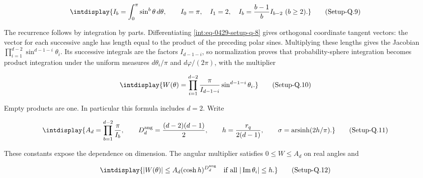 \label{int:eq-setup-q-9}
\begingroup\renewcommand{\theHequation}{intdisplay.877}
\begin{equation}
\intdisplay{
I_b=\int_0^\pi\sin^b\theta\,d\theta,\qquad
I_0=\pi,\quad I_1=2,\quad
I_b=\frac{b-1}{b}I_{b-2}\ (b\ge2).
}
\tag{Setup-Q.9}
\label{int:eq-0430-setup-q-9}
\end{equation}
\endgroup


The recurrence follows by integration by parts. Differentiating \hyperref[int:eq-setup-q-8]{\eqref{int:eq-0429-setup-q-8}} gives orthogonal coordinate tangent vectors: the vector for each successive angle has length equal to the product of the preceding polar sines. Multiplying these lengths gives the Jacobian \(\prod_{i=1}^{d-2}\sin^{d-1-i}\theta_i\). Its successive integrals are the factors \(I_{d-1-i}\), so normalization proves that probability-sphere integration becomes product integration under the uniform measures \(d\theta_i/\pi\) and \(d\varphi/(2\pi)\), with the multiplier


\label{int:eq-setup-q-10}
\begingroup\renewcommand{\theHequation}{intdisplay.878}
\begin{equation}
\intdisplay{
W(\theta)=\prod_{i=1}^{d-2}
\frac{\pi}{I_{d-1-i}}\sin^{d-1-i}\theta_i.
}
\tag{Setup-Q.10}
\label{int:eq-0431-setup-q-10}
\end{equation}
\endgroup


Empty products are one. In particular this formula includes \(d=2\). Write


\label{int:eq-setup-q-11}
\begingroup\renewcommand{\theHequation}{intdisplay.879}
\begin{equation}
\intdisplay{
A_d=\prod_{b=1}^{d-2}\frac{\pi}{I_b},\qquad
D_d^{\rm ang}=\frac{(d-2)(d-1)}2,\qquad
h=\frac{r_q}{2(d-1)},\qquad
\sigma=\operatorname{arsinh}(2h/\pi).
}
\tag{Setup-Q.11}
\label{int:eq-0432-setup-q-11}
\end{equation}
\endgroup


These constants expose the dependence on dimension. The angular multiplier satisfies \(0\le W\le A_d\) on real angles and


\label{int:eq-setup-q-12}
\begingroup\renewcommand{\theHequation}{intdisplay.880}
\begin{equation}
\intdisplay{
|W(\theta)|\le A_d(\cosh h)^{D_d^{\rm ang}}
\quad\text{if all }|\operatorname{Im}\theta_i|\le h.
}
\tag{Setup-Q.12}
\label{int:eq-0433-setup-q-12}
\end{equation}
\endgroup

